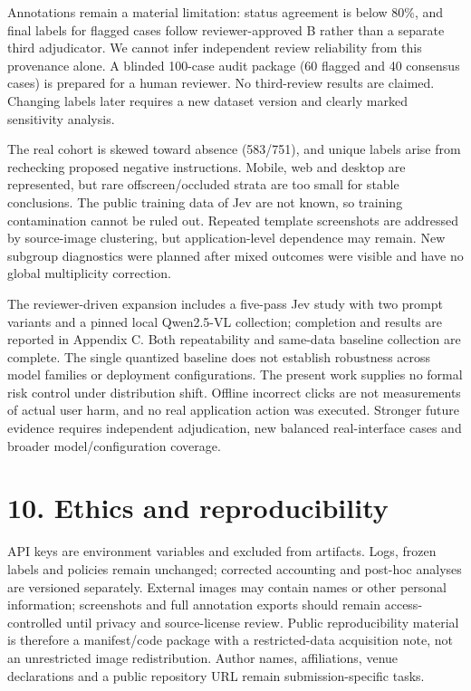 \documentclass[10pt]{article}
\begin{document}
Annotations remain a material limitation: status agreement is below 80\%, and final labels for flagged cases follow reviewer-approved B rather than a separate third adjudicator. We cannot infer independent review reliability from this provenance alone. A blinded 100-case audit package (60 flagged and 40 consensus cases) is prepared for a human reviewer. No third-review results are claimed. Changing labels later requires a new dataset version and clearly marked sensitivity analysis.

The real cohort is skewed toward absence (583/751), and unique labels arise from rechecking proposed negative instructions. Mobile, web and desktop are represented, but rare offscreen/occluded strata are too small for stable conclusions. The public training data of Jev are not known, so training contamination cannot be ruled out. Repeated template screenshots are addressed by source-image clustering, but application-level dependence may remain. New subgroup diagnostics were planned after mixed outcomes were visible and have no global multiplicity correction.

The reviewer-driven expansion includes a five-pass Jev study with two prompt variants and a pinned local Qwen2.5-VL collection; completion and results are reported in Appendix C. Both repeatability and same-data baseline collection are complete. The single quantized baseline does not establish robustness across model families or deployment configurations. The present work supplies no formal risk control under distribution shift. Offline incorrect clicks are not measurements of actual user harm, and no real application action was executed. Stronger future evidence requires independent adjudication, new balanced real-interface cases and broader model/configuration coverage.

\section*{10. Ethics and reproducibility}
API keys are environment variables and excluded from artifacts. Logs, frozen labels and policies remain unchanged; corrected accounting and post-hoc analyses are versioned separately. External images may contain names or other personal information; screenshots and full annotation exports should remain access-controlled until privacy and source-license review. Public reproducibility material is therefore a manifest/code package with a restricted-data acquisition note, not an unrestricted image redistribution. Author names, affiliations, venue declarations and a public repository URL remain submission-specific tasks.
\end{document}
